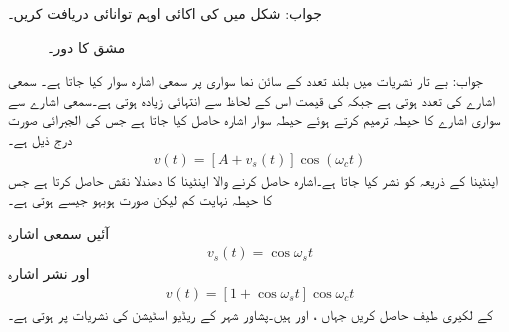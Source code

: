 جواب:
شکل  میں  کی اکائی اوہم توانائی دریافت کریں۔
\begin{figure}
\centering
{}
\caption{مشق  کا دور۔}
\label{شکل_فوریئر_امالی_دور_الف}
\end{figure}

جواب:
بے تار نشریات میں بلند تعدد  کے سائن نما سواری پر سمعی اشارہ  سوار کیا جاتا ہے۔ سمعی اشارے کی تعدد  ہوتی ہے جبکہ  کی قیمت اس کے لحاظ سے  انتہائی زیادہ ہوتی ہے۔سمعی اشارے  سے سواری اشارے کا حیطہ ترمیم کرتے ہوئے حیطہ سوار اشارہ حاصل کیا جاتا ہے جس کی الجبرائی صورت درج ذیل ہے۔
\begin{align}
v(t)=[A+v_s(t)]\cos(\omega_c t)
\end{align}
اینٹینا کے ذریعہ  کو نشر کیا جاتا ہے۔اشارہ حاصل کرنے والا اینٹینا  کا دھندلا نقش  حاصل کرتا ہے جس کا حیطہ نہایت کم لیکن صورت ہوبہو  جیسے ہوتی ہے۔

آئیں سمعی اشارہ 
\begin{align}
v_s(t)=\cos \omega_s t
\end{align}
اور  نشر اشارہ 
\begin{align}
v(t)=[1+\cos \omega_s t] \cos \omega_c t
\end{align}
کے لکیری طیف حاصل کریں جہاں ،  اور  ہیں۔پشاور شہر کے ریڈیو اسٹیشن کی نشریات  پر ہوتی ہے۔ 

